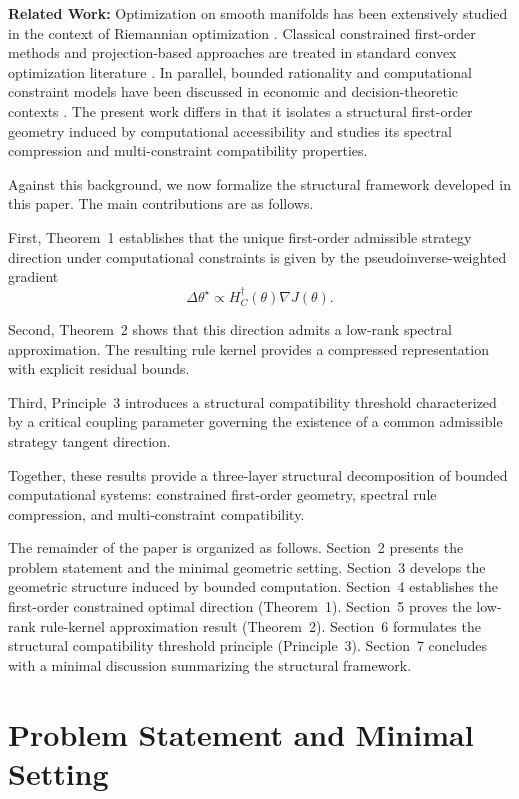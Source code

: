 \documentclass[11pt,a4paper,twocolumn]{article}
\begin{document}
\textbf{Related Work:}
Optimization on smooth manifolds has been extensively studied in the context of Riemannian optimization \cite{absil2008optimization,boumal2023introduction}. 
Classical constrained first-order methods and projection-based approaches are treated in standard convex optimization literature \cite{boyd2004convex}. 
In parallel, bounded rationality and computational constraint models have been discussed in economic and decision-theoretic contexts \cite{simon1957models,gigerenzer2001bounded}. 
The present work differs in that it isolates a structural first-order geometry induced by computational accessibility and studies its spectral compression and multi-constraint compatibility properties.

Against this background, we now formalize the structural framework developed in this paper. The main contributions are as follows.

First, Theorem~1 establishes that
the unique first-order admissible strategy direction
under computational constraints
is given by the pseudoinverse-weighted gradient
\[
\Delta\theta^\star \propto H_C^\dagger(\theta)\nabla J(\theta).
\]

Second, Theorem~2 shows that this direction
admits a low-rank spectral approximation.
The resulting rule kernel
provides a compressed representation
with explicit residual bounds.

Third, Principle~3 introduces
a structural compatibility threshold
characterized by a critical coupling parameter
governing the existence of a common admissible strategy tangent direction.

Together, these results provide
a three-layer structural decomposition
of bounded computational systems:
constrained first-order geometry,
spectral rule compression,
and multi-constraint compatibility.

The remainder of the paper is organized as follows.
Section~2 presents the problem statement and the minimal geometric setting.
Section~3 develops the geometric structure induced by bounded computation.
Section~4 establishes the first-order constrained optimal direction (Theorem~1).
Section~5 proves the low-rank rule-kernel approximation result (Theorem~2).
Section~6 formulates the structural compatibility threshold principle (Principle~3).
Section~7 concludes with a minimal discussion summarizing the structural framework.

\section{Problem Statement and Minimal Setting}
\end{document}
